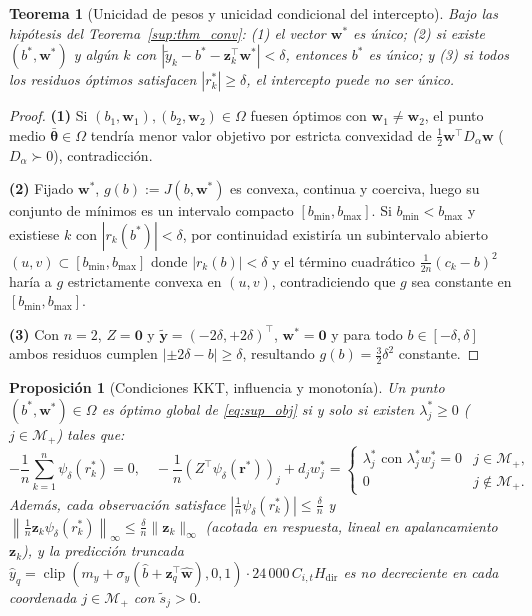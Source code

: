 \documentclass[11pt,a4paper]{article}
\newtheorem{theorem}{Teorema}
\newtheorem{proposition}{Proposición}
\DeclareMathOperator{\clip}{clip}
\begin{document}
\begin{theorem}[Unicidad de pesos y unicidad condicional del intercepto]\label{sup:thm_unic}
Bajo las hipótesis del Teorema~\ref{sup:thm_conv}: (1) el vector $\mathbf{w}^*$ es único; (2) si existe $(b^*, \mathbf{w}^*)$ y algún $k$ con $|\tilde{y}_k - b^* - \mathbf{z}_k^\top \mathbf{w}^*| < \delta$, entonces $b^*$ es único; y (3) si todos los residuos óptimos satisfacen $|r_k^*| \ge \delta$, el intercepto puede no ser único.
\end{theorem}

\begin{proof}
\textbf{(1)} Si $(b_1, \mathbf{w}_1), (b_2, \mathbf{w}_2) \in \Omega$ fuesen óptimos con $\mathbf{w}_1 \ne \mathbf{w}_2$, el punto medio $\bar{\boldsymbol{\theta}} \in \Omega$ tendría menor valor objetivo por estricta convexidad de $\frac{1}{2}\mathbf{w}^\top D_\alpha \mathbf{w}$ ($D_\alpha \succ 0$), contradicción.

\textbf{(2)} Fijado $\mathbf{w}^*$, $g(b) := J(b, \mathbf{w}^*)$ es convexa, continua y coerciva, luego su conjunto de mínimos es un intervalo compacto $[b_{\min}, b_{\max}]$. Si $b_{\min} < b_{\max}$ y existiese $k$ con $|r_k(b^*)| < \delta$, por continuidad existiría un subintervalo abierto $(u,v) \subset [b_{\min}, b_{\max}]$ donde $|r_k(b)| < \delta$ y el término cuadrático $\frac{1}{2n}(c_k - b)^2$ haría a $g$ estrictamente convexa en $(u,v)$, contradiciendo que $g$ sea constante en $[b_{\min}, b_{\max}]$.

\textbf{(3)} Con $n=2$, $Z = \mathbf{0}$ y $\tilde{\mathbf{y}} = (-2\delta, +2\delta)^\top$, $\mathbf{w}^* = \mathbf{0}$ y para todo $b \in [-\delta, \delta]$ ambos residuos cumplen $|\pm 2\delta - b| \ge \delta$, resultando $g(b) = \frac{3}{2}\delta^2$ constante.
\end{proof}

\begin{proposition}[Condiciones KKT, influencia y monotonía]\label{sup:prop_kkt}
Un punto $(b^*, \mathbf{w}^*) \in \Omega$ es óptimo global de \eqref{eq:sup_obj} si y solo si existen $\lambda_j^* \ge 0$ ($j \in \mathcal{M}_+$) tales que:
\[
-\frac{1}{n}\sum_{k=1}^n \psi_\delta(r_k^*) = 0, \quad
-\frac{1}{n}(Z^\top \psi_\delta(\mathbf{r}^*))_j + d_j w_j^* = \begin{cases} \lambda_j^* \text{ con } \lambda_j^* w_j^* = 0 & j \in \mathcal{M}_+, \\ 0 & j \notin \mathcal{M}_+. \end{cases}
\]
Además, cada observación satisface $\left|\frac{1}{n}\psi_\delta(r_k^*)\right| \le \frac{\delta}{n}$ y $\left\|\frac{1}{n}\mathbf{z}_k \psi_\delta(r_k^*)\right\|_\infty \le \frac{\delta}{n}\|\mathbf{z}_k\|_\infty$ (acotada en respuesta, lineal en apalancamiento $\mathbf{z}_k$), y la predicción truncada $\hat{y}_q = \clip(m_y + \sigma_y(\hat{b} + \mathbf{z}_q^\top \hat{\mathbf{w}}), 0, 1)\cdot 24\,000\,C_{i,t} H_{\mathrm{dir}}$ es no decreciente en cada coordenada $j \in \mathcal{M}_+$ con $\tilde{s}_j > 0$.
\end{proposition}
\end{document}
